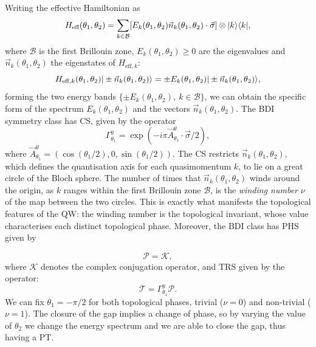 Writing the effective Hamiltonian as 
\begin{equation}
H_{\text{eff}}(\theta_1,\theta_2) =\sum_{k\in\mathcal{B} }[E_k (\theta_1,\theta_2)\vec{n}_k (\theta_1,\theta_2)\cdot\vec{\sigma}]\otimes| k \rangle\langle k |,
\end{equation}
where $\mathcal {B} $ is the first Brillouin zone, $E_k(\theta_1,\theta_2) \geq 0$ are the eigenvalues and $\vec{n}_k(\theta_1,\theta_2)$ the eigenstates of $H_{\text{eff},k}:$
 \begin{equation}
H_{\text{eff},k} (\theta_1,\theta_2)| \pm\vec{n}_k(\theta_1,\theta_2) \rangle = \pm E_k(\theta_1,\theta_2)| \pm\vec{n}_k(\theta_1,\theta_2) \rangle, 	
\label{Eq: Eigensystem of H_k}
 \end{equation}
forming the two energy bands $\{\pm E_k(\theta_1,\theta_2), \ k\in \mathcal{B}\}$, we can obtain the specific form of the spectrum $E_k(\theta_1,\theta_2)$ and the vectors $\vec{n}_k(\theta_1,\theta_2)$.
 The BDI symmetry class has CS, given by the operator~\cite{kit:rud:ber:dem:10,kit:12} 
 \begin{equation}
 \Gamma_{\theta_1}^y=\exp(-i\pi \vec{A}_{\theta_1}^y\cdot\vec\sigma/2),
 \end{equation}
 where $\vec{A}_{\theta_1}^y=(\cos(\theta_1/2),0,\sin(\theta_1/2))$. 
The CS restricts $\vec{n}_k(\theta_1,\theta_2)$, which defines the quantisation axis for each quasimomentum $k$, to lie on a great circle of the Bloch sphere. The number of times that $\vec{n}_k(\theta_1,\theta_2)$ winds around the origin, as $k$ ranges within the first Brillouin zone $\mathcal B$, is the {\em winding number} $\nu$ of the map between the two circles. This is exactly what manifests the topological features of the QW: the winding number is the topological invariant, whose value characterises each distinct topological phase. Moreover, the BDI class has PHS given by

\begin{equation}
\mathcal{P}=	\mathcal{K},
\end{equation}
where $\mathcal{K}$ denotes the complex conjugation operator, and TRS given by the operator:
\begin{equation}
\mathcal{T}=	\Gamma_{\theta_1}^y\mathcal{P}.
\end{equation}
We can fix $\theta_1=-\pi/2$ for both topological phases, trivial ($\nu=0$) and non-trivial ($\nu=1$). 
The closure of the gap implies a change of phase, so  by varying the value of $\theta_2$ we change the energy spectrum and we are able to close the gap, thus having a PT. 

